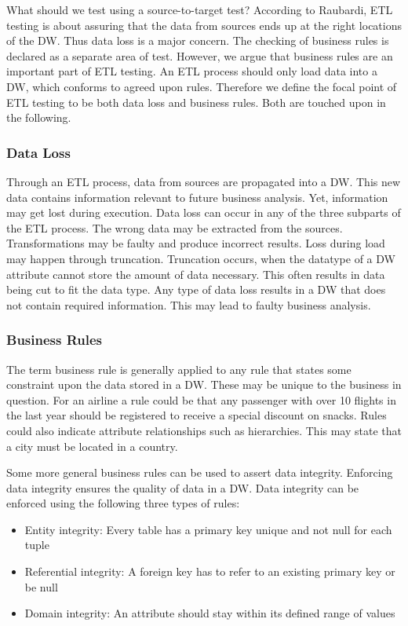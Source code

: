 What should we test using a source-to-target test? According to Raubardi, ETL testing is about assuring that the data from sources ends up at the right locations of the DW. Thus data loss is a major concern. The checking of business rules is declared as a separate area of test. However, we argue that business rules are an important part of ETL testing. An ETL process should only load data into a DW, which conforms to agreed upon rules. Therefore we define the focal point of ETL testing to be both data loss and business rules. Both are touched upon in the following.

\subsubsection{Data Loss}
Through an ETL process, data from sources are propagated into a DW. This new data contains information relevant to future business analysis. Yet, information may get lost during execution. Data loss can occur in any of the three subparts of the ETL process. The wrong data may be extracted from the sources. Transformations may be faulty and produce incorrect results. Loss during load may happen through truncation. Truncation occurs, when the datatype of a DW attribute cannot store the amount of data necessary. This often results in data being cut to fit the data type. Any type of data loss results in a DW that does not contain required information. This may lead to faulty business analysis.

\subsubsection{Business Rules}
The term business rule is generally applied to any rule that states some constraint upon the data stored in a DW. These may be unique to the business in question. For an airline a rule could be  that any passenger with over 10 flights in the last year should be registered to receive a special discount on snacks. Rules could also indicate attribute relationships such as hierarchies. This may state that a city must be located in a country. 

Some more general business rules can be used to assert data integrity. Enforcing data integrity ensures the quality of data in a DW. Data integrity can be enforced using the following three types of rules:

\begin{itemize}
\item Entity integrity: Every table has a primary key unique and not null for each tuple
\item Referential integrity: A foreign key has to refer to an existing primary key or be null
\item Domain integrity: An attribute should stay within its defined range of values
\end{itemize}

